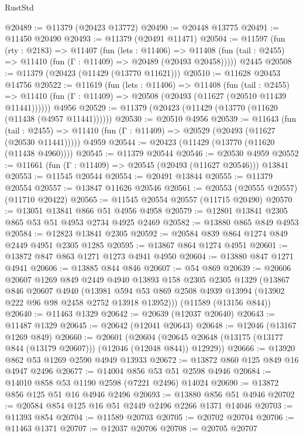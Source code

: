 \begin{lexlean}{RustStd}
\begin{coremodule}
@20489 := @11379 (@20423 @13772)
@20490 := @20448 @13775
@20491 := @11450 @20490
@20493 := @11379 (@20491 @11471)
@20504 := @11597
    (fun (rty : @2183) =>
    @11407
      (fun (lets : @11406) =>
      @11408 (fun (tail : @2455) => @11410 (fun (Γ : @11409) => @20489 (@20493 @20458)))))
    @2445
@20508 := @11379 (@20423 (@11429 (@13770 @11621)))
@20510 := @11628 @20453 @14756
@20522 := @11619
    (fun (lets : @11406) =>
    @11408
      (fun (tail : @2455) =>
      @11410 (fun (Γ : @11409) => @20508 (@20493 (@11627 (@20510 @11439 @11441))))))
    @4956
@20529 := @11379 (@20423 (@11429 (@13770 (@11620 (@11438 (@4957 @11441))))))
@20530 := @20510 @4956
@20539 := @11643
    (fun (tail : @2455) => @11410 (fun (Γ : @11409) => @20529 (@20493 (@11627 (@20530 @11441)))))
    @4959
@20544 := @20423 (@11429 (@13770 (@11620 (@11438 @4960))))
@20545 := @11379 @20544
@20546 := @20530 @4959
@20552 := @11661 (fun (Γ : @11409) => @20545 (@20493 (@11627 @20546))) @13841
@20553 := @11545 @20544
@20554 := @20491 @13844
@20555 := @11379 @20554
@20557 := @13847 @11626 @20546
@20561 := @20553 (@20555 @20557) (@11710 @20422)
@20565 := @11545 @20554 @20557 (@11715 @20490)
@20570 := @13051 @13841 @866 @51 @4956 @4958
@20579 := @12801 @13841 @2305 @865 @53 @51 @4953 @2734 @4925 @2469
@20582 := @13880 @865 @849 @4953
@20584 := @12823 @13841 @2305
@20592 := @20584 @839 @864 @1274 @849 @2449 @4951 @2305 @1285
@20595 := @13867 @864 @1274 @4951
@20601 := @13872 @847 @863 @1271 @1273 @4941 @4950
@20604 := @13880 @847 @1271 @4941
@20606 := @13885 @844 @846
@20607 := @54 @869
@20639 := @20606
    @20607
    @1269
    @849
    @2449
    @4940
    @13893
    @158
    @2305
    @2305
    @1329
    (@13867
      @846
      @20607
      @4940
      (@13981 @594 @53 @869 @2508 @4939 @13994 (@13902 @222 @96 @98 @2458 @2752 @13918 @13952)))
    (@11589 (@13156 @844))
@20640 := @11463 @1329
@20642 := @20639 (@12037 @20640)
@20643 := @11487 @1329
@20645 := @20642 (@12041 @20643)
@20648 := @12046 (@13167 @1269 @849)
@20660 := @20601
    (@20604 (@20645 @20648 (@13175 (@13177 @844 (@13179 @20607))) (@12046 (@12048 @844)) @12929))
@20666 := @13920 @862 @53 @1269 @2590 @4949 @13933
@20672 := @13872 @860 @125 @849 @16 @4947 @2496
@20677 := @14004 @856 @53 @51 @2598 @4946
@20684 := @14010 @858 @53 @1190 @2598 (@7221 @2496) @14024
@20690 := @13872 @856 @125 @51 @16 @4946 @2496
@20693 := @13880 @856 @51 @4946
@20702 := @20584 @854 @125 @16 @51 @2449 @2496 @2266 @1371 @14046
@20703 := @11393 @854
@20704 := @11589 @20703
@20705 := @20702 @20704
@20706 := @11463 @1371
@20707 := @12037 @20706
@20708 := @20705 @20707

\end{coremodule}
\end{lexlean}
